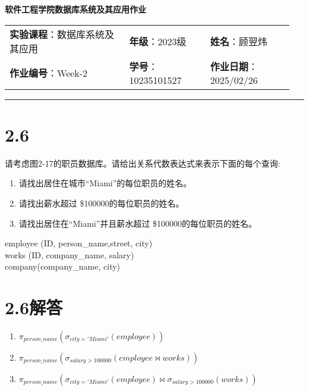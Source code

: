 \documentclass{article}
\begin{document}
	
	\begin{center}
		{\Large{\textbf{\heiti 软件工程学院数据库系统及其应用作业}}}
		\begin{table}[htb]
			\flushleft
			\begin{tabular}{p{0.4\linewidth}p{0.27\linewidth}p{0.28\linewidth}}\\
				\textbf{实验课程}：数据库系统及其应用  & \textbf{年级}：2023级       & \textbf{姓名}：顾翌炜  \\
				\textbf{作业编号}：Week-2    & \textbf{学号}：10235101527 & \textbf{作业日期}：2025/02/26  \\
			\end{tabular}
		\end{table}
	\end{center}
	\rule{\textwidth}{2pt}
	
	\setlength{\parindent}{2em}
	
    \section*{2.6}
    
    请考虑图2-17的职员数据库。请给出关系代数表达式来表示下面的每个查询: 
    \begin{enumerate}
    	\item 请找出居住在城市“Miami”的每位职员的姓名。
    	\item 请找出薪水超过 \$100000的每位职员的姓名。
    	\item 请找出居住在“Miami”并且薪水超过 \$100000的每位职员的姓名。
    \end{enumerate}
    
    \begin{tcolorbox}[title = {2-17的职员数据库}, colback = blue!25!white, colframe = blue!75!black]
    	employee (ID, person\_name,street, city)\\
    	works (ID, company\_name, salary) \\
    	company(company\_name, city)
    \end{tcolorbox}
    
    \section*{2.6解答}
    
    \begin{enumerate}[noitemsep, label={{\arabic*})}]
    	\item $\pi_{person\_name}(\sigma_{city='Miami'}(employee))$
    	\item $\pi_{person\_name}(\sigma_{salary>100000}(employee \bowtie works))$
    	\item $\pi_{person\_name}(\sigma_{city='Miami'}(employee) \bowtie \sigma_{salary>100000}(works))$
    \end{enumerate}\textbf{}
    
\end{document}
